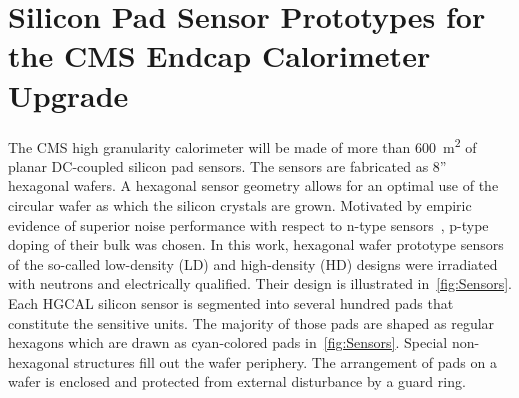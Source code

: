 \section{Silicon Pad Sensor Prototypes for the CMS Endcap Calorimeter Upgrade}
\label{sec:sensors}

The CMS high granularity calorimeter will be made of more than \SI{600}{\metre\squared} of planar DC-coupled silicon pad sensors.
The sensors are fabricated as 8'' hexagonal wafers.
A hexagonal sensor geometry allows for an optimal use of the circular wafer as which the silicon crystals are grown.
Motivated by empiric evidence of superior noise performance with respect to n-type sensors~\cite{Adam_2017}, p-type doping of their bulk was chosen.\newline
In this work, hexagonal wafer prototype sensors of the so-called low-density (LD) and high-density (HD) designs were irradiated with neutrons and electrically qualified.
Their design is illustrated in~\ref{fig:Sensors}.
Each HGCAL silicon sensor is segmented into several hundred pads that constitute the sensitive units. 
The majority of those pads are shaped as regular hexagons which are drawn as cyan-colored pads in~\ref{fig:Sensors}.
Special non-hexagonal structures fill out the wafer periphery.
The arrangement of pads on a wafer is enclosed and protected from external disturbance by a guard ring.
